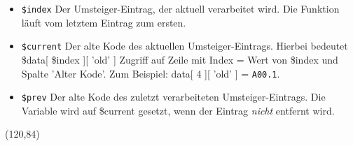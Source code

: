 \begin{itemize}
\item \texttt{\$index}
  \newline Der Umsteiger-Eintrag, der aktuell verarbeitet wird.
  \newline Die Funktion läuft vom letztem Eintrag zum ersten.
\item \texttt{\$current}
  \newline Der alte Kode des aktuellen Umsteiger-Eintrags.
  \newline Hierbei bedeutet \$data[ \$index ][ 'old' ] Zugriff auf Zeile mit Index = Wert von \$index und Spalte 'Alter Kode'. Zum Beispiel: data[ 4 ][ 'old' ] = \texttt{A00.1}.
\item \texttt{\$prev}
  \newline Der alte Kode des zuletzt verarbeiteten Umsteiger-Eintrags.
  \newline Die Variable wird auf \$current gesetzt, wenn der Eintrag \emph{nicht} entfernt wird.
\end{itemize}

\newpage

\begin{centernss}
\small
\begin{struktogramm}(120,84)
    \change
    \ifend
    \whileend
\end{struktogramm}
\end{centernss}

